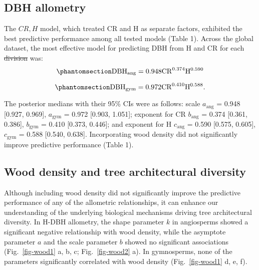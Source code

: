 \documentclass[
  12pt,
  letterpaper,
  DIV=11,
  numbers=noendperiod]{scrartcl}
\providecommand{\DIFadd}[1]{{\protect\color{blue}\uwave{#1}}} %
\providecommand{\DIFdel}[1]{{\protect\color{red}\sout{#1}}}                      %
\providecommand{\DIFaddbegin}{} %
\providecommand{\DIFaddend}{} %
\providecommand{\DIFdelbegin}{} %
\providecommand{\DIFdelend}{} %
\newcommand{\DIFscaledelfig}{0.5}
\newlength{\DIFdelgraphicswidth} %
\newlength{\DIFdelgraphicsheight} %
\newcommand{\DIFaddincludegraphics}[2][]{{\color{blue}\fbox{\DIFOincludegraphics[#1]{#2}}}} %
\newcommand{\DIFdelincludegraphics}[2][]{%
\sbox{\DIFdelgraphicsbox}{\DIFOincludegraphics[#1]{#2}}%
\settoboxwidth{\DIFdelgraphicswidth}{\DIFdelgraphicsbox} %
\settoboxtotalheight{\DIFdelgraphicsheight}{\DIFdelgraphicsbox} %
\scalebox{\DIFscaledelfig}{%
\parbox[b]{\DIFdelgraphicswidth}{\usebox{\DIFdelgraphicsbox}\\[-\baselineskip] \rule{\DIFdelgraphicswidth}{0em}}\llap{\resizebox{\DIFdelgraphicswidth}{\DIFdelgraphicsheight}{%
\setlength{\unitlength}{\DIFdelgraphicswidth}%
\begin{picture}(1,1)%
\thicklines\linethickness{2pt} %
{\color[rgb]{1,0,0}\put(0,0){\framebox(1,1){}}}%
{\color[rgb]{1,0,0}\put(0,0){\line( 1,1){1}}}%
{\color[rgb]{1,0,0}\put(0,1){\line(1,-1){1}}}%
\end{picture}%
}\hspace*{3pt}}} %
} %
\DeclareRobustCommand{\DIFaddbegin}{\DIFOaddbegin \let\includegraphics\DIFaddincludegraphics} %
\DeclareRobustCommand{\DIFaddend}{\DIFOaddend \let\includegraphics\DIFOincludegraphics} %
\DeclareRobustCommand{\DIFdelbegin}{\DIFOdelbegin \let\includegraphics\DIFdelincludegraphics} %
\DeclareRobustCommand{\DIFdelend}{\DIFOaddend \let\includegraphics\DIFOincludegraphics} %
\begin{document}
\subsection{DBH allometry}\label{dbh-allometry}

The \(CR,H\) model, which treated CR and H as separate factors,
exhibited the best predictive performance among all tested models (Table
1). Across the global dataset, the most effective model for predicting
DBH from H and CR for each \DIFdelbegin \DIFdel{division }\DIFdelend \DIFaddbegin \DIFadd{clade }\DIFaddend was:
\begin{equation}\phantomsection\label{eq-dbh_ang}{
\mathrm{DBH_{ang}} = \mathrm{0.948}
\mathrm{CR}^{\text{0.374}}
\mathrm{H}^{\text{0.590}}
}\end{equation}

\begin{equation}\phantomsection\label{eq-dbh_gym}{
\mathrm{DBH_{gym}} = \mathrm{0.972}
\mathrm{CR}^{\text{0.410}}
\mathrm{H}^{\text{0.588}}.
}\end{equation}

The posterior medians with their 95\% CIs were as follows: scale
\(a_{\text{ang}}\) = 0.948 {[}0.927, 0.969{]}, \(a_{\text{gym}}\) =
0.972 {[}0.903, 1.051{]}; exponent for CR \(b_{\text{ang}}\) = 0.374
{[}0.361, 0.386{]}, \(b_{\text{gym}}\) = 0.410 {[}0.373, 0.446{]}; and
exponent for H \(c_{\text{ang}}\) = 0.590 {[}0.575, 0.605{]},
\(c_{\text{gym}}\) = 0.588 {[}0.540, 0.638{]}. Incorporating wood
density did not significantly improve predictive performance (Table 1).

\subsection{Wood density and tree architectural
diversity}\label{wood-density-and-tree-architectural-diversity}

Although including wood density did not significantly improve the
predictive performance of any of the allometric relationships, it can
enhance our understanding of the underlying biological mechanisms
driving tree architectural diversity. In H-DBH allometry, the shape
parameter \(k\) in angiosperms showed a significant negative
relationship with wood density, while the asymptote parameter \(a\) and
the scale parameter \(b\) showed no significant associations
(Fig.~\ref{fig-wood1} a, b, c; Fig.~\ref{fig-wood2} a). In gymnosperms,
none of the parameters significantly correlated with wood density
(Fig.~\ref{fig-wood1} d, e, f).
\end{document}
